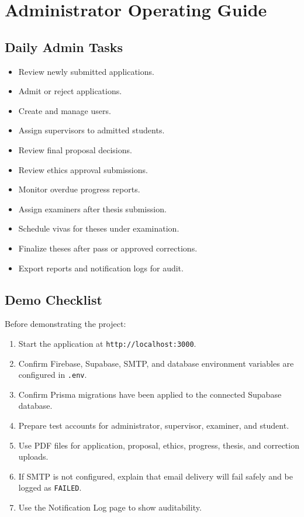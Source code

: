 \documentclass[11pt,a4paper]{article}
\newcommand{\status}[1]{\texttt{#1}}
\newcommand{\code}[1]{\texttt{#1}}
\begin{document}
\section{Administrator Operating Guide}

\subsection{Daily Admin Tasks}

\begin{itemize}
  \item Review newly submitted applications.
  \item Admit or reject applications.
  \item Create and manage users.
  \item Assign supervisors to admitted students.
  \item Review final proposal decisions.
  \item Review ethics approval submissions.
  \item Monitor overdue progress reports.
  \item Assign examiners after thesis submission.
  \item Schedule vivas for theses under examination.
  \item Finalize theses after pass or approved corrections.
  \item Export reports and notification logs for audit.
\end{itemize}

\newpage

\subsection{Demo Checklist}

Before demonstrating the project:

\begin{enumerate}
  \item Start the application at \code{http://localhost:3000}.
  \item Confirm Firebase, Supabase, SMTP, and database environment variables are configured in \code{.env}.
  \item Confirm Prisma migrations have been applied to the connected Supabase database.
  \item Prepare test accounts for administrator, supervisor, examiner, and student.
  \item Use PDF files for application, proposal, ethics, progress, thesis, and correction uploads.
  \item If SMTP is not configured, explain that email delivery will fail safely and be logged as \status{FAILED}.
  \item Use the Notification Log page to show auditability.
\end{enumerate}
\end{document}
